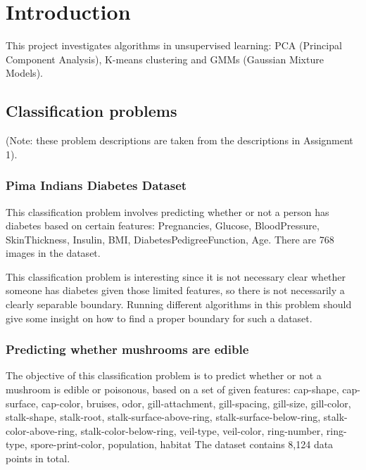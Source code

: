 \documentclass[11pt]{article}
\begin{document}
        \section{Introduction}
            
            This project investigates algorithms in unsupervised
            learning: PCA (Principal Component Analysis), K-means
            clustering and GMMs (Gaussian Mixture Models).

            \subsection{Classification problems}

            (Note: these problem descriptions are taken from the descriptions in Assignment 1).
            \subsubsection{Pima Indians Diabetes Dataset}

            This classification problem involves predicting whether or not a person has diabetes
            based on certain features: Pregnancies, Glucose, BloodPressure, SkinThickness, Insulin, BMI, DiabetesPedigreeFunction, Age.
            There are 768 images in the dataset.

            This classification problem is interesting since it is not necessary
            clear whether someone has diabetes given those limited features, so there
            is not necessarily a clearly separable boundary. Running different algorithms
            in this problem should give some insight on how to find a proper boundary for
            such a dataset.

            \subsubsection{Predicting whether mushrooms are edible}

            The objective of this classification problem is to predict
            whether or not a mushroom is edible or poisonous, based on a set
            of given features: cap-shape, cap-surface, cap-color, bruises, odor, gill-attachment, gill-spacing, gill-size, gill-color, stalk-shape, stalk-root, stalk-surface-above-ring, stalk-surface-below-ring, stalk-color-above-ring, stalk-color-below-ring, veil-type, veil-color, ring-number, ring-type, spore-print-color, population, habitat
            The dataset contains 8,124 data points in total.
\end{document}
